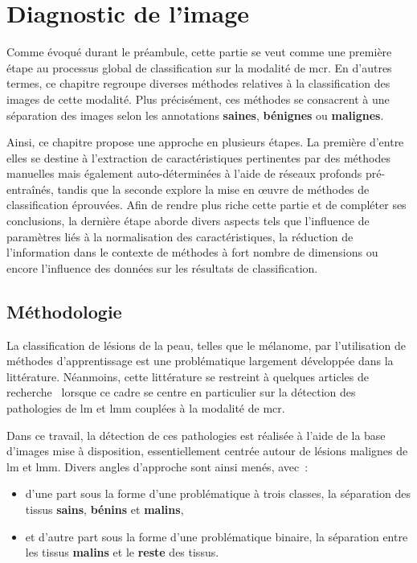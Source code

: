 \renewcommand{\thechapter}{\arabic{chapter}}
\setcounter{chapter}{4}

\chapter{Diagnostic de l'image}
\label{chap:chapter_5}
\chapterintro
Comme évoqué durant le préambule, cette partie se veut comme une première étape au processus global de classification sur la modalité de \gls{mcr}. En d'autres termes, ce chapitre regroupe diverses méthodes relatives à la classification des images de cette modalité. Plus précisément, ces méthodes se consacrent à une séparation des images selon les annotations \textbf{saines}, \textbf{bénignes} ou \textbf{malignes}.\par

Ainsi, ce chapitre propose une approche en plusieurs étapes. La première d'entre elles se destine à l'extraction de caractéristiques pertinentes par des méthodes manuelles mais également auto-déterminées à l'aide de réseaux profonds pré-entraînés, tandis que la seconde explore la mise en œuvre de méthodes de classification éprouvées. Afin de rendre plus riche cette partie et de compléter ses conclusions, la dernière étape aborde divers aspects tels que l'influence de paramètres liés à la normalisation des caractéristiques, la réduction de l'information dans le contexte de méthodes à fort nombre de dimensions ou encore l'influence des données sur les résultats de classification.\par	
\newpage

\section{Méthodologie}
La classification de lésions de la peau, telles que le mélanome, par l'utilisation de méthodes d'apprentissage est une problématique largement développée dans la littérature. Néanmoins, cette littérature se restreint à quelques articles de recherche~\cite{Halimi2017a, Halimi2017b, Wiltgen2008, Koller2010} lorsque ce cadre se centre en particulier sur la détection des pathologies de \gls{lm} et \gls{lmm} couplées à la modalité de \gls{mcr}.\par

Dans ce travail, la détection de ces pathologies est réalisée à l'aide de la base d'images mise à disposition, essentiellement centrée autour de lésions malignes de \gls{lm} et \gls{lmm}. Divers angles d'approche sont ainsi menés, avec~:~
\begin{itemize}
    \item d'une part sous la forme d'une problématique à trois classes, la séparation des tissus \textbf{sains}, \textbf{bénins} et \textbf{malins},
    \item et d'autre part sous la forme d'une problématique binaire, la séparation entre les tissus \textbf{malins} et le \textbf{reste} des tissus.
\end{itemize}\par


